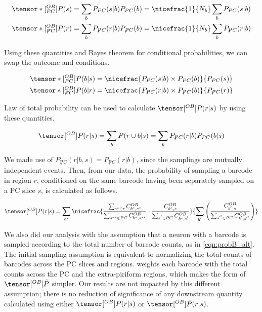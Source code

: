 \documentclass[../dissertation.tex]{subfiles}
\begin{document}
\begin{align}
    \tensor*[^{OB}_{PC}]{P}{}      (s) & = \sum_b P_{PC}      (s | b) P_{PC}      (b) = \nicefrac{1}{N_b} \sum_b P_{PC}      (s | b) \\
    \tensor*[^{OB}_{\not PC}]{P}{} (r) & = \sum_b P_{\not PC} (r | b) P_{\not PC} (b) = \nicefrac{1}{N_b} \sum_b P_{\not PC} (r | b)
\end{align}

Using these quantities and Bayes theorem for conditional probabilities, we can swap the outcome and conditions.

\begin{align}
    \tensor*[^{OB}_{PC}]{P}{}      (b | s) & = \nicefrac{ P_{PC}      (s | b) \times P_{PC}      (b) }{ P_{PC}      (s) } \\
    \tensor*[^{OB}_{\not PC}]{P}{} (b | r) & = \nicefrac{ P_{\not PC} (r | b) \times P_{\not PC} (b) }{ P_{\not PC} (r) }
\end{align}

Law of total probability can be used to calculate $\tensor[^{OB}]{P}{} (r | s)$ by using these quantities.

\begin{align}
    \tensor[^{OB}]{P}{} (r | s) = \sum_b P(r \cup b | s) = \sum_b P_{\not PC}(r | b) P_{PC}(b | s)
\end{align}

We made use of $P_{\not PC}(r | b, s) = P_{\not PC}(r | b)$, since the samplings are mutually independent events.
Then, from our data, the probability of sampling a barcode in region $r$, conditioned on the same barcode having been separately sampled on a PC slice $s$, is calculated as follows.

\begin{align}
    \tensor[^{OB}]{P}{} (r | s)  = \sum_{ b^{*} } \nicefrac{
        \frac{ \sum_{ s^{*} \in r } C^{OB}_{ b^{*} , s^{*} } }{ \sum_{ s^{**} \notin PC} C^{OB}_{ b^{*} , s^{**} } } \cdot
        \frac{                      C^{OB}_{ b^{*} , s     } }{ \sum_{ s^{ '} \in    PC} C^{OB}_{ b^{*} , s^{'}  } }
    }{
        \sum_{ b^{'} } \left(
            \frac{ C^{OB}_{ b^{'} , s } }{ \sum_{ s^{''} \in PC } C^{OB}_{ b^{'} , s^{''} } }
        \right)
    }
\end{align}

We also did our analysis with the assumption that a neuron with a barcode is sampled according to the total number of barcode counts, as in \cref{eqn:probB_alt}.
The initial sampling assumption is equivalent to normalizing the total counts of barcodes across the PC slices and regions.
 weights each barcode with the total counts across the PC and the extra-piriform regions, which makes the form of $\tensor[^{OB}]{\tilde{P}}{}$ simpler.
Our results are not impacted by this different assumption; there is no reduction of significance of any downstream quantity calculated using either $\tensor[^{OB}]{P}{} (r|s)$ or $\tensor[^{OB}]{\tilde{P}}{} (r|s)$.
\end{document}
